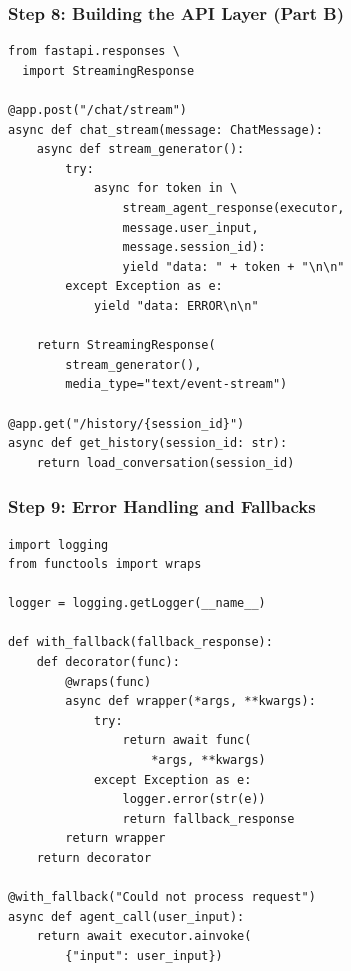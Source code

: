 \documentclass[aspectratio=169,11pt]{beamer}
\begin{document}
\begin{frame}[fragile]
  \frametitle{Step 8: Building the API Layer (Part B)}

  \begin{lstlisting}
from fastapi.responses \
  import StreamingResponse

@app.post("/chat/stream")
async def chat_stream(message: ChatMessage):
    async def stream_generator():
        try:
            async for token in \
                stream_agent_response(executor,
                message.user_input,
                message.session_id):
                yield "data: " + token + "\n\n"
        except Exception as e:
            yield "data: ERROR\n\n"

    return StreamingResponse(
        stream_generator(),
        media_type="text/event-stream")

@app.get("/history/{session_id}")
async def get_history(session_id: str):
    return load_conversation(session_id)
  \end{lstlisting}
\end{frame}

\begin{frame}[fragile]
  \frametitle{Step 9: Error Handling and Fallbacks}

  \begin{lstlisting}
import logging
from functools import wraps

logger = logging.getLogger(__name__)

def with_fallback(fallback_response):
    def decorator(func):
        @wraps(func)
        async def wrapper(*args, **kwargs):
            try:
                return await func(
                    *args, **kwargs)
            except Exception as e:
                logger.error(str(e))
                return fallback_response
        return wrapper
    return decorator

@with_fallback("Could not process request")
async def agent_call(user_input):
    return await executor.ainvoke(
        {"input": user_input})
  \end{lstlisting}
\end{frame}
\end{document}
